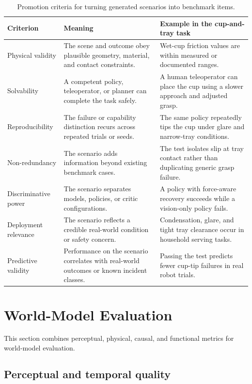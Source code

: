 \documentclass[sigconf,review,anonymous]{acmart}
\begin{document}
\begin{table}[t]
\centering
\caption{Promotion criteria for turning generated scenarios into benchmark items.}
\label{tab:promotion}
\small
\begin{tabular}{p{}p{}p{}}
\toprule
\textbf{Criterion} & \textbf{Meaning} & \textbf{Example in the cup-and-tray task} \\
\midrule
Physical validity & The scene and outcome obey plausible geometry, material, and contact constraints. & Wet-cup friction values are within measured or documented ranges. \\
Solvability & A competent policy, teleoperator, or planner can complete the task safely. & A human teleoperator can place the cup using a slower approach and adjusted grasp. \\
Reproducibility & The failure or capability distinction recurs across repeated trials or seeds. & The same policy repeatedly tips the cup under glare and narrow-tray conditions. \\
Non-redundancy & The scenario adds information beyond existing benchmark cases. & The test isolates slip at tray contact rather than duplicating generic grasp failure. \\
Discriminative power & The scenario separates models, policies, or critic configurations. & A policy with force-aware recovery succeeds while a vision-only policy fails. \\
Deployment relevance & The scenario reflects a credible real-world condition or safety concern. & Condensation, glare, and tight tray clearance occur in household serving tasks. \\
Predictive validity & Performance on the scenario correlates with real-world outcomes or known incident classes. & Passing the test predicts fewer cup-tip failures in real robot trials. \\
\bottomrule
\end{tabular}
\end{table}

\section{World-Model Evaluation}

This section combines perceptual, physical, causal, and functional metrics for world-model evaluation.

\subsection{Perceptual and temporal quality}
\end{document}
